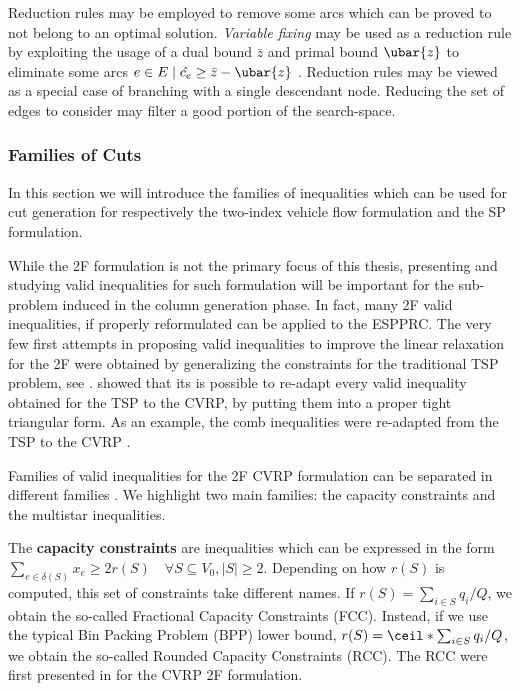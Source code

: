 Reduction rules may be employed to remove some arcs
which can be proved to not belong to an optimal solution.
\textit{Variable fixing} may be used as a reduction rule by exploiting
the usage of a dual bound $\bar{z}$ and primal bound $\ubar{z}$ to eliminate some
arcs $e \in E \mid \hat{c_e} \ge \bar{z} - \ubar{z}$ \parencite{hadjar2006, irnich2010}.
Reduction rules may be viewed as a special case of branching
with a single descendant node.
Reducing the set of edges to consider may filter a good portion of the search-space.



\subsubsection{Families of Cuts}
\label{sec:families-of-cuts}

In this section we will introduce the families of inequalities
which can be used for cut generation for respectively
the two-index vehicle flow formulation
and the SP formulation.


While the 2F formulation is not the primary focus of this thesis,
presenting and studying valid inequalities for such formulation
will be important for the sub-problem induced in the column generation phase.
In fact, many 2F valid inequalities, if properly reformulated
can be applied to the ESPPRC.
The very few first attempts in proposing valid inequalities
to improve the linear relaxation for the 2F were obtained by
generalizing the constraints for the traditional TSP problem, see \textcite{naddef1993}.
\citeauthor{naddef1993} showed that its is possible to re-adapt
every valid inequality obtained for the TSP to the CVRP,
by putting them into a proper tight triangular form.
As an example,
the comb inequalities were re-adapted from the TSP to the CVRP \parencite{chvatal1973,grotschel1979,augerat1995approche}.

Families of valid inequalities for the 2F CVRP formulation
can be separated in different families \parencite{toth2014}.
We highlight two main families: the capacity constraints and the multistar inequalities.

The \textbf{capacity constraints} are inequalities which can be expressed in the form
$\sum_{e \in \delta(S)} x_e \ge 2 r(S) \quad \forall S \subseteq V_0, |S| \ge 2$.
Depending on how $r(S)$ is computed, this set of constraints take different names.
If $r(S) = \sum_{i \in S} q_i / Q$, we obtain the so-called Fractional Capacity Constraints (FCC).
Instead, if we use the typical Bin Packing Problem (BPP) lower bound, $r(S) = \ceil*{\sum_{i \in S} q_i / Q}$, we obtain the so-called Rounded Capacity Constraints (RCC).
The RCC were first presented in \textcite{laporte1983} for the CVRP 2F formulation.

